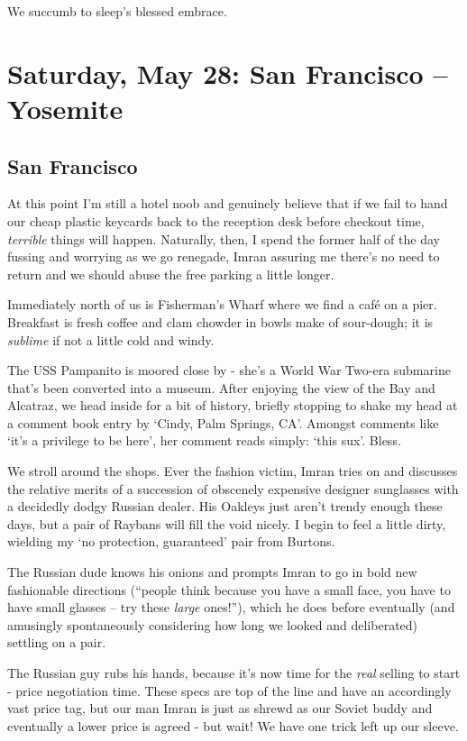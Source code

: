 \documentclass[a5paper,titlepage,11pt]{book}
\begin{document}
We succumb to sleep's blessed embrace.

\chapter[San Francisco -- Yosemite]{Saturday, May 28: San Francisco -- Yosemite}
\section*{San Francisco}
At this point I'm still a hotel noob and genuinely believe that if we fail to hand our cheap plastic keycards back to the reception desk before checkout time, \emph{terrible} things will happen. Naturally, then, I spend the former half of the day fussing and worrying as we go renegade, Imran assuring me there's no need to return and we should abuse the free parking a little longer.

Immediately north of us is Fisherman's Wharf where we find a caf\'{e} on a pier. Breakfast is fresh coffee and clam chowder in bowls make of sour-dough; it is \emph{sublime} if not a little cold and windy.

The USS Pampanito is moored close by - she's a World War Two-era submarine that's been converted into a museum. After enjoying the view of the Bay and Alcatraz, we head inside for a bit of history, briefly stopping to shake my head at a comment book entry by `Cindy, Palm Springs, CA'. Amongst comments like `it's a privilege to be here', her comment reads simply: `this sux'. Bless.

We stroll around the shops. Ever the fashion victim, Imran tries on and discusses the relative merits of a succession of obscenely expensive designer sunglasses with a decidedly dodgy Russian dealer. His Oakleys just aren't trendy enough these days, but a pair of Raybans will fill the void nicely. I begin to feel a little dirty, wielding my  `no protection, guaranteed' pair from Burtons.

The Russian dude knows his onions and prompts Imran to go in bold new fashionable directions (``people think because you have a small face, you have to have small glasses -- try these \emph{large} ones!''), which he does before eventually (and amusingly spontaneously considering how long we looked and deliberated) settling on a pair.

The Russian guy rubs his hands, because it's now time for the \emph{real} selling to start - price negotiation time. These specs are top of the line and have an accordingly vast price tag, but our man Imran is just as shrewd as our Soviet buddy and eventually a lower price is agreed - but wait!  We have one trick left up our sleeve.
\end{document}
